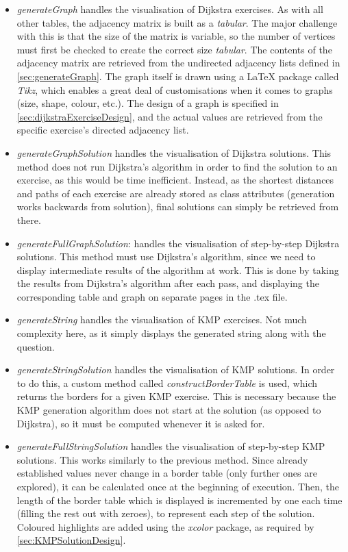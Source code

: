 \documentclass{l4proj}
\begin{document}
\begin{itemize}
	\item
	\emph{generateGraph} handles the visualisation of Dijkstra exercises. As with all other tables, the adjacency matrix is built as a \emph{tabular}. The major challenge with this is that the size of the matrix is variable, so the number of vertices must first be checked to create the correct size \emph{tabular}. The contents of the adjacency matrix are retrieved from the undirected adjacency lists defined in \autoref{sec:generateGraph}. The graph itself is drawn using a LaTeX package called \emph{Tikz}, which enables a great deal of customisations when it comes to graphs (size, shape, colour, etc.). The design of a graph is specified in \autoref{sec:dijkstraExerciseDesign}, and the actual values are retrieved from the specific exercise's directed adjacency list.
	\item
	\emph{generateGraphSolution} handles the visualisation of Dijkstra solutions. This method does not run Dijkstra's algorithm in order to find the solution to an exercise, as this would be time inefficient. Instead, as the shortest distances and paths of each exercise are already stored as class attributes (generation works backwards from solution), final solutions can simply be retrieved from there.
	\item
	\emph{generateFullGraphSolution}: handles the visualisation of step-by-step Dijkstra solutions. This method must use Dijkstra's algorithm, since we need to display intermediate results of the algorithm at work. This is done by taking the results from Dijkstra's algorithm after each pass, and displaying the corresponding table and graph on separate pages in the .tex file.  
	\item
	\emph{generateString} handles the visualisation of KMP exercises. Not much complexity here, as it simply displays the generated string along with the question.
	\item
	\emph{generateStringSolution} handles the visualisation of KMP solutions. In order to do this, a custom method called \emph{constructBorderTable} is used, which returns the borders for a given KMP exercise. This is necessary because the KMP generation algorithm does not start at the solution (as opposed to Dijkstra), so it must be computed whenever it is asked for.
	\item
	\emph{generateFullStringSolution} handles the visualisation of step-by-step KMP solutions. This works similarly to the previous method. Since already established values never change in a border table (only further ones are explored), it can be calculated once at the beginning of execution. Then, the length of the border table which is displayed is incremented by one each time (filling the rest out with zeroes), to represent each step of the solution. Coloured highlights are added using the \emph{xcolor} package, as required by \autoref{sec:KMPSolutionDesign}.
\end{itemize}
\end{document}

